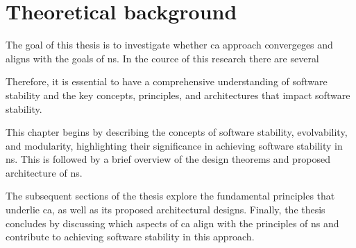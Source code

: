 \chapter{Theoretical background} \label{chap_theoreticalbackground} 

The goal of this thesis is to investigate whether \gls{ca} approach convergeges and aligns
with the goals of \gls{ns}. In the cource of this research there are several 

Therefore, it is essential to have a comprehensive
understanding of software stability and the key concepts, principles, and architectures
that impact software stability.

This chapter begins by describing the concepts of software stability, evolvability, and
modularity, highlighting their significance in achieving software stability in \gls{ns}.
This is followed by a brief overview of the design theorems and proposed architecture of
\gls{ns}.

The subsequent sections of the thesis explore the fundamental principles that underlie
\gls{ca}, as well as its proposed architectural designs. Finally, the thesis
concludes by discussing which aspects of \gls{ca} align with the principles of
\gls{ns} and contribute to achieving software stability in this approach.




